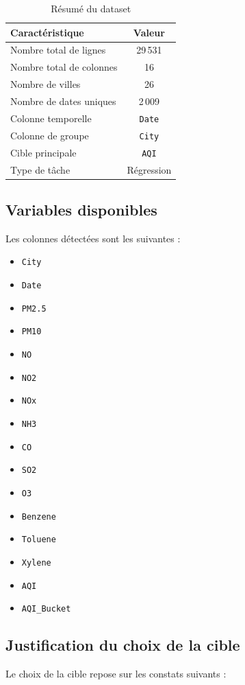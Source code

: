 \documentclass[11pt,a4paper]{article}
\begin{document}
\begin{table}[H]
\centering
\caption{Résumé du dataset}
\begin{tabular}{lc}
\toprule
\textbf{Caractéristique} & \textbf{Valeur} \\
\midrule
Nombre total de lignes & 29\,531 \\
Nombre total de colonnes & 16 \\
Nombre de villes & 26 \\
Nombre de dates uniques & 2\,009 \\
Colonne temporelle & \texttt{Date} \\
Colonne de groupe & \texttt{City} \\
Cible principale & \texttt{AQI} \\
Type de tâche & Régression \\
\bottomrule
\end{tabular}
\end{table}

\subsection{Variables disponibles}
Les colonnes détectées sont les suivantes :

\begin{itemize}
    \item \texttt{City}
    \item \texttt{Date}
    \item \texttt{PM2.5}
    \item \texttt{PM10}
    \item \texttt{NO}
    \item \texttt{NO2}
    \item \texttt{NOx}
    \item \texttt{NH3}
    \item \texttt{CO}
    \item \texttt{SO2}
    \item \texttt{O3}
    \item \texttt{Benzene}
    \item \texttt{Toluene}
    \item \texttt{Xylene}
    \item \texttt{AQI}
    \item \texttt{AQI\_Bucket}
\end{itemize}

\subsection{Justification du choix de la cible}
Le choix de la cible repose sur les constats suivants :
\end{document}
